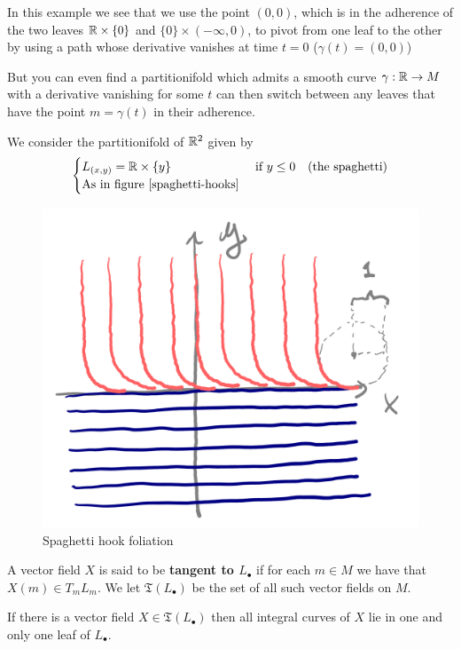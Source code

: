 	In this example we see that we use the point $(0,0)$, which is in the adherence of the two leaves $\mathbb{R} \times \{0\}$ and $\{0\} \times (-\infty, 0)$, to pivot from one leaf to the other by using a path whose derivative vanishes at time $t=0$ ($\gamma(t) = (0,0)$)

	But you can even find a partitionifold which admits a smooth curve $\gamma: \mathbb{R} \to M$ with a derivative vanishing for some $t$ can then switch between any leaves that have the point $m = \gamma(t)$ in their adherence.

	\begin{example}
		We consider the partitionifold of $\mathbb{R}^2$ given by
		$$
		\begin{cases}
			L_{(x,y)} = \mathbb{R} \times \{y\}            &\text{ if } y \leq 0 \quad \text{(the spaghetti)} \\
			\text{As in figure \ref{spaghetti-hooks}}
		\end{cases}
		$$
	\end{example}

    \begin{figure}[H]
        \centering
        \includegraphics[width=0.5\linewidth]{spaghetti-hook.png}
        \caption{Spaghetti hook foliation}
        \label{spaghetti-hooks}
    \end{figure}

    \begin{definition}
        A vector field $X$ is said to be \textbf{tangent to $L_\bullet$} if for each $m \in M$ we have that $X(m) \in T_m L_m$. We let $\mathfrak{T}(L_\bullet)$ be the set of all such vector fields on $M$.
    \end{definition}

    \begin{prop}
	   If there is a vector field $X \in \mathfrak{T}(L_\bullet)$ then all integral curves of $X$ lie in one and only one leaf of $L_\bullet$.
    \end{prop}

